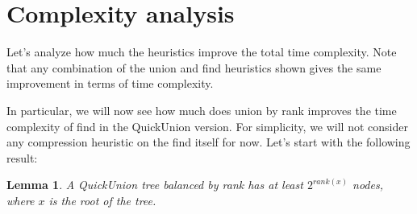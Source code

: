 \documentclass{article}
\newtheorem{lemma}{Lemma}
\begin{document}
\section{Complexity analysis}\label{complex}
Let's analyze how much the heuristics improve the total time complexity. Note that any combination of 
the union and find heuristics  shown gives the same improvement in terms of time complexity. 

In particular, we will now see
how much does union by rank improves the time complexity of find in the QuickUnion version.
For simplicity, we will not consider any compression heuristic on the find itself for now. 
Let's start with the following result:
\begin{lemma}\label{rank}
    A QuickUnion tree balanced by rank has at least $2^{rank(x)}$ nodes, where $x$ is the root of the tree.
\end{lemma}
\end{document}
